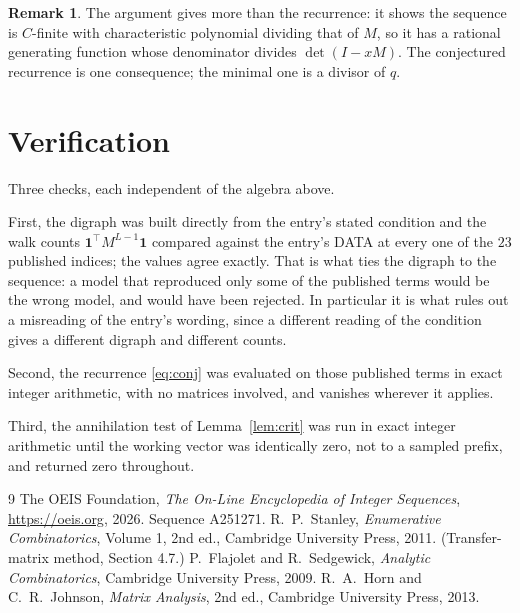 \documentclass[11pt,a4paper]{article}
\theoremstyle{plain}
\theoremstyle{definition}
\newtheorem{remark}[theorem]{Remark}
\begin{document}
\begin{remark}
The argument gives more than the recurrence: it shows the sequence is $C$-finite with
characteristic polynomial dividing that of $M$, so it has a rational generating function
whose denominator divides $\det(I-xM)$. The conjectured recurrence is one consequence; the
minimal one is a divisor of $q$.
\end{remark}

\section{Verification}

Three checks, each independent of the algebra above.

First, the digraph was built directly from the entry's stated condition and the walk counts
$\mathbf{1}^{\!\top}M^{L-1}\mathbf{1}$ compared against the entry's DATA at
every one of the $23$ published indices; the values agree exactly. That is what ties
the digraph to the sequence: a model that reproduced only some of the published terms would
be the wrong model, and would have been rejected. In particular it is what rules out a
misreading of the entry's wording, since a different reading of the condition gives a
different digraph and different counts.

Second, the recurrence \eqref{eq:conj} was evaluated on those published terms in exact
integer arithmetic, with no matrices involved, and vanishes wherever it applies.

Third, the annihilation test of Lemma~\ref{lem:crit} was run in exact integer arithmetic
until the working vector was identically zero, not to a sampled prefix, and returned zero
throughout.

\begin{thebibliography}{9}
 The OEIS Foundation, \emph{The On-Line Encyclopedia of Integer
Sequences}, \url{https://oeis.org}, 2026. Sequence A251271.
 R.~P.~Stanley, \emph{Enumerative Combinatorics}, Volume 1, 2nd ed.,
Cambridge University Press, 2011. (Transfer-matrix method, Section 4.7.)
 P.~Flajolet and R.~Sedgewick, \emph{Analytic Combinatorics}, Cambridge
University Press, 2009.
 R.~A.~Horn and C.~R.~Johnson, \emph{Matrix Analysis}, 2nd ed., Cambridge
University Press, 2013.
\end{thebibliography}
\end{document}
